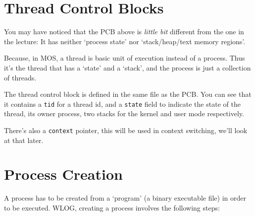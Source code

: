 \section{Thread Control Blocks}

You may have noticed that the PCB above is \textit{little bit} different from the one in the
lecture: It has neither `process state' nor `stack/heap/text memory regions'.

Because, in MOS, a thread is basic unit of execution instead of a process. Thus it's the thread that has a
`state' and a `stack', and the process is just a collection of threads.

The thread control block is defined in the same file as the PCB. You can see that it contains
a \texttt{tid} for a thread id, and a \texttt{state} field to indicate the state of the thread,
its owner process, two stacks for the kernel and user mode respectively.

There's also a \texttt{context} pointer, this will be used in context switching, we'll look at
that later.

\section{Process Creation}

A process has to be created from a `program' (a binary executable file) in order to be
executed. WLOG, creating a process involves the following steps:

